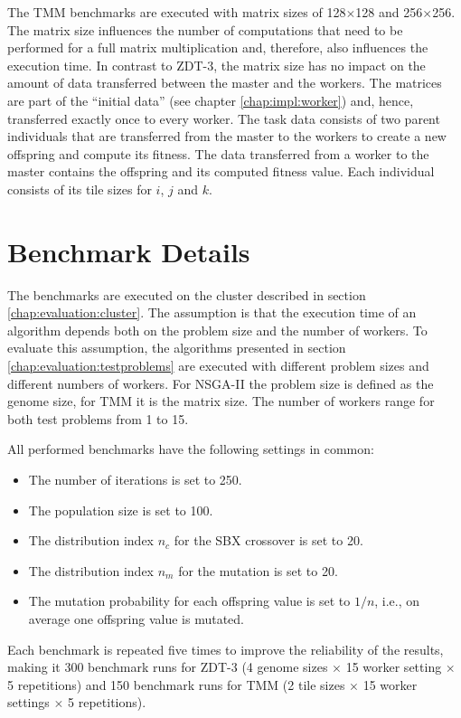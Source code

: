 The TMM benchmarks are executed with matrix sizes of 128$\times$128 and 256$\times$256. The matrix size influences the number of computations that need to be performed for a full matrix multiplication and, therefore, also influences the execution time. In contrast to ZDT-3, the matrix size has no impact on the amount of data transferred between the master and the workers. The matrices are part of the ``initial data'' (see chapter \ref{chap:impl:worker}) and, hence, transferred exactly once to every worker. The task data consists of two parent individuals that are transferred from the master to the workers to create a new offspring and compute its fitness. The data transferred from a worker to the master contains the offspring and its computed fitness value. Each individual consists of its tile sizes for $i$, $j$ and $k$.

\section{Benchmark Details}
\label{chap:evaluation:benchmark-details}
The benchmarks are executed on the cluster described in section \ref{chap:evaluation:cluster}. The assumption is that the execution time of an algorithm depends both on the problem size and the number of workers. To evaluate this assumption, the algorithms presented in section \ref{chap:evaluation:testproblems} are executed with different problem sizes and different numbers of workers. For NSGA-II the problem size is defined as the genome size, for TMM it is the matrix size. The number of workers range for both test problems from 1 to 15.

All performed benchmarks have the following settings in common:
\begin{itemize}
  \item The number of iterations is set to 250.
  \item The population size is set to 100.
  \item The distribution index $n_c$ for the SBX crossover is set to 20.
  \item The distribution index $n_m$ for the mutation is set to 20.
  \item The mutation probability for each offspring value is set to $1/n$, i.e., on average one offspring value is mutated.
\end{itemize}

Each benchmark is repeated five times to improve the reliability of the results, making it 300 benchmark runs for ZDT-3 (4 genome sizes $\times$ 15 worker setting $\times$ 5 repetitions) and 150 benchmark runs for TMM (2 tile sizes $\times$ 15 worker settings $\times$ 5 repetitions).


